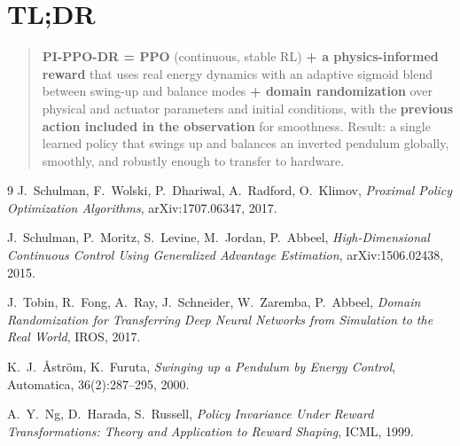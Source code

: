 \documentclass[11pt,a4paper]{article}
\begin{document}
\section*{TL;DR}
\begin{quote}
\textbf{PI-PPO-DR = PPO} (continuous, stable RL) \textbf{+ a physics-informed reward} that uses real energy dynamics with an adaptive sigmoid blend between swing-up and balance modes \textbf{+ domain randomization} over physical and actuator parameters and initial conditions, with the \textbf{previous action included in the observation} for smoothness. Result: a single learned policy that swings up and balances an inverted pendulum globally, smoothly, and robustly enough to transfer to hardware.
\end{quote}

\begin{thebibliography}{9}
J.~Schulman, F.~Wolski, P.~Dhariwal, A.~Radford, O.~Klimov,
\emph{Proximal Policy Optimization Algorithms},
arXiv:1707.06347, 2017.

J.~Schulman, P.~Moritz, S.~Levine, M.~Jordan, P.~Abbeel,
\emph{High-Dimensional Continuous Control Using Generalized Advantage Estimation},
arXiv:1506.02438, 2015.

J.~Tobin, R.~Fong, A.~Ray, J.~Schneider, W.~Zaremba, P.~Abbeel,
\emph{Domain Randomization for Transferring Deep Neural Networks from
Simulation to the Real World},
IROS, 2017.

K.~J.~\AA{}str\"om, K.~Furuta,
\emph{Swinging up a Pendulum by Energy Control},
Automatica, 36(2):287--295, 2000.

A.~Y.~Ng, D.~Harada, S.~Russell,
\emph{Policy Invariance Under Reward Transformations: Theory and Application to Reward Shaping},
ICML, 1999.

\end{thebibliography}
\end{document}
